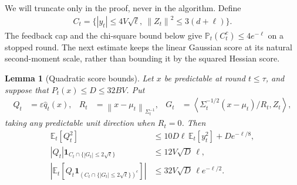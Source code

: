 \documentclass[11pt]{article}
\newtheorem{lemma}[lemma]{Lemma}
\newcommand{\E}{\mathbb E}
\newcommand{\Pp}{\mathbb P}
\newcommand{\1}{\mathbf 1}
\newcommand{\eps}{\varepsilon}
\newcommand{\ip}[2]{\left\langle #1,#2\right\rangle}
\newcommand{\norm}[1]{\left\lVert #1\right\rVert}
\newcommand{\normm}[2]{\left\lVert #1\right\rVert_{#2}}
\begin{document}
We will truncate only in the proof, never in the algorithm. Define
\begin{align}
    C_t=\{|y_t|\leq4V\sqrt\ell,\ \norm{Z_t}^2\leq3(d+\ell)\}.
    \label{eq:common-truncation}
\end{align}
The feedback cap and the chi-square bound below give
$\Pp_t(C_t^c)\leq4e^{-\ell}$ on a stopped round.
The next estimate keeps the linear Gaussian score at its natural
second-moment scale, rather than bounding it by the squared Hessian score.
\begin{lemma}[Quadratic score bounds]
    \label{lem:quadratic-score-bounds}
    Let $x$ be predictable at round $t\leq\tau$, and suppose that
    $P_t(x)\leq D\leq32BV$. Put
    \begin{align}
        Q_t & =\eps\widehat q_t(x),
            & R_t                   & =\normm{x-\mu_t}{\Sigma_t^{-1}},
            & G_t                   & =\ip{\Sigma_t^{-1/2}(x-\mu_t)/R_t}{Z_t},
    \end{align}
    taking any predictable unit direction when $R_t=0$. Then
    \begin{align}
        \E_t[Q_t^2]
         & \leq10D\ell\,\E_t[y_t^2]+De^{-\ell/8},
        \label{eq:q-predictable-second-moment}
        \\
        |Q_t|\1_{C_t\cap\{|G_t|\leq2\sqrt\ell\}}
         & \leq12V\sqrt D\,\ell,
        \label{eq:q-score-bound}
        \\
        \left|\E_t\left[Q_t\1_{(C_t\cap\{|G_t|\leq2\sqrt\ell\})^c}\right]\right|
         & \leq32V\sqrt D\,\ell e^{-\ell/2}.
        \label{eq:q-truncation-bias}
    \end{align}
\end{lemma}
\end{document}
